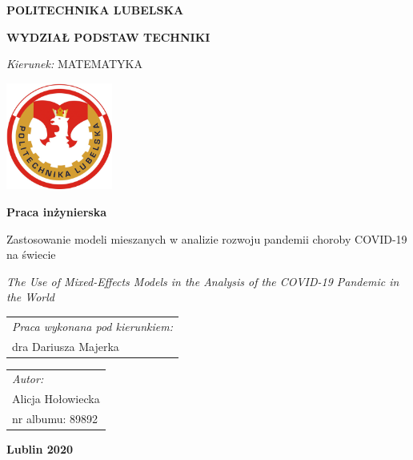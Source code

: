 \documentclass[12pt]{mwbk}
\theoremstyle{plain}
\theoremstyle{definition}
\theoremstyle{remark}
\begin{document}

\thispagestyle{empty}  %


\newcommand\tytul{Zastosowanie modeli mieszanych w analizie rozwoju pandemii choroby COVID-19 na świecie}

\newcommand\tytulangielski{The Use of Mixed-Effects Models in the Analysis of the COVID-19 Pandemic in the World}


\begin{center}


{\large \bf POLITECHNIKA LUBELSKA}

{\bf WYDZIAŁ PODSTAW TECHNIKI}

\emph{Kierunek:} MATEMATYKA


\vfill %
     

\includegraphics[width=3.5cm]{rys/logopl}

\vfill

\textbf{Praca inżynierska}

\vfill
\vfill
\vfill

\large
\tytul

\vfill

\emph{\tytulangielski}


\vfill
\vfill
\vfill
\vfill
\vfill

\begin{tabular}[t]{l}
\emph{Praca wykonana pod kierunkiem:}
\\
dra Dariusza Majerka
\end{tabular}
\hfill
\begin{tabular}[t]{l}
	\emph{Autor:}
\\
Alicja Hołowiecka\\
nr albumu: 89892 
\end{tabular}

\vfill
\vfill
\vfill

\textbf{Lublin 2020}

\end{center}
\end{document}
